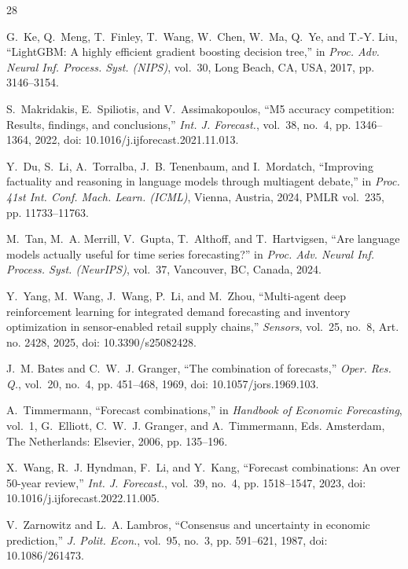 \documentclass[conference]{IEEEtran}
\begin{document}
\begin{thebibliography}{28}

G.~Ke, Q.~Meng, T.~Finley, T.~Wang, W.~Chen, W.~Ma, Q.~Ye, and T.-Y. Liu, ``LightGBM: A highly
efficient gradient boosting decision tree,'' in \emph{Proc. Adv. Neural Inf. Process. Syst.
(NIPS)}, vol.~30, Long Beach, CA, USA, 2017, pp. 3146--3154.

S.~Makridakis, E.~Spiliotis, and V.~Assimakopoulos, ``M5 accuracy competition: Results, findings,
and conclusions,'' \emph{Int. J. Forecast.}, vol.~38, no.~4, pp. 1346--1364, 2022,
doi: 10.1016/j.ijforecast.2021.11.013.

Y.~Du, S.~Li, A.~Torralba, J.~B. Tenenbaum, and I.~Mordatch, ``Improving factuality and reasoning
in language models through multiagent debate,'' in \emph{Proc. 41st Int. Conf. Mach. Learn.
(ICML)}, Vienna, Austria, 2024, PMLR vol.~235, pp. 11733--11763.

M.~Tan, M.~A. Merrill, V.~Gupta, T.~Althoff, and T.~Hartvigsen, ``Are language models actually
useful for time series forecasting?'' in \emph{Proc. Adv. Neural Inf. Process. Syst. (NeurIPS)},
vol.~37, Vancouver, BC, Canada, 2024.

Y.~Yang, M.~Wang, J.~Wang, P.~Li, and M.~Zhou, ``Multi-agent deep reinforcement learning for
integrated demand forecasting and inventory optimization in sensor-enabled retail supply chains,''
\emph{Sensors}, vol.~25, no.~8, Art. no. 2428, 2025, doi: 10.3390/s25082428.

J.~M. Bates and C.~W.~J. Granger, ``The combination of forecasts,'' \emph{Oper. Res. Q.}, vol.~20,
no.~4, pp. 451--468, 1969, doi: 10.1057/jors.1969.103.

A.~Timmermann, ``Forecast combinations,'' in \emph{Handbook of Economic Forecasting}, vol.~1,
G.~Elliott, C.~W.~J. Granger, and A.~Timmermann, Eds. Amsterdam, The Netherlands: Elsevier, 2006,
pp. 135--196.

X.~Wang, R.~J. Hyndman, F.~Li, and Y.~Kang, ``Forecast combinations: An over 50-year review,''
\emph{Int. J. Forecast.}, vol.~39, no.~4, pp. 1518--1547, 2023,
doi: 10.1016/j.ijforecast.2022.11.005.

V.~Zarnowitz and L.~A. Lambros, ``Consensus and uncertainty in economic prediction,'' \emph{J.
Polit. Econ.}, vol.~95, no.~3, pp. 591--621, 1987, doi: 10.1086/261473.


\end{thebibliography}
\end{document}
